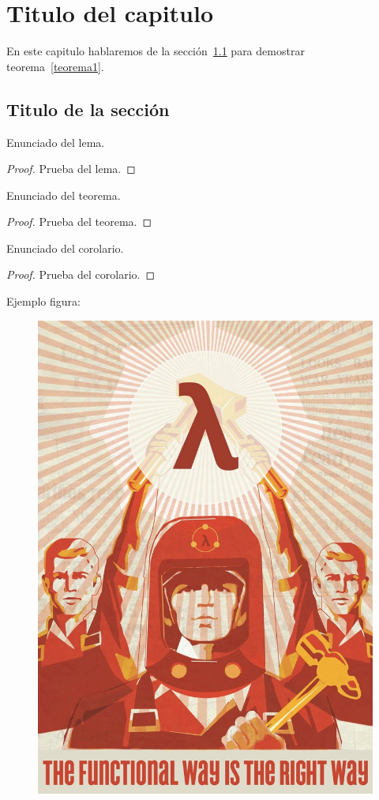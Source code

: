 \chapter{Titulo del capitulo}\label{cap1}

En este capitulo hablaremos de la sección~\ref{cap1:sec1} para demostrar
teorema~\ref{teorema1}.

\section{Titulo de la sección}\label{cap1:sec1}

\begin{lemma}\label{lema1}
	Enunciado del lema.
\end{lemma}

\begin{proof}
	Prueba del lema.
\end{proof}

\begin{theorem}\label{teorema1}
	Enunciado del teorema.
\end{theorem}

\begin{proof}
	Prueba del teorema.
\end{proof}

\begin{corollary}\label{corolario1}
	Enunciado del corolario.
\end{corollary}

\begin{proof}
	Prueba del corolario.
\end{proof}

Ejemplo figura:

\begin{figure}[h]
	\centering
	\includegraphics[width=1\textwidth]{Imgs/FunctionalWay.jpg}
\end{figure}
